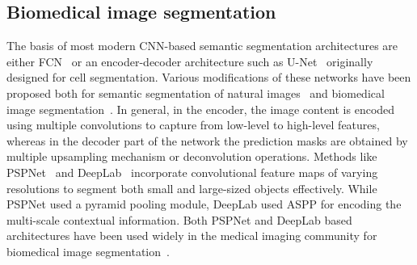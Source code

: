 \documentclass[journal]{IEEEtran}
\begin{document}
\subsection{Biomedical image segmentation}
The basis of most modern \ac{CNN}-based semantic segmentation architectures are either \ac{FCN}~\cite{long2015fully} or an encoder-decoder architecture such as  U-Net~\cite{ronneberger2015u} originally designed for cell segmentation. Various modifications of these networks have been proposed both for semantic segmentation of natural images~\cite{zhao2017pyramid,wang2020deep} and biomedical image segmentation~\cite{zhou2018unet,oktay2018attention,zhou2019unet++,fan2020pranet,jha2019resunet++,jha2020doubleu,wang2020boundary}. In general, in the encoder, the image content is encoded using multiple convolutions to capture from low-level to high-level features, whereas in the decoder part of the network the prediction masks are obtained by multiple upsampling mechanism {or deconvolution operations}. Methods like PSPNet~\cite{zhao2017pyramid} and DeepLab~\cite{chen2017deeplab} incorporate convolutional feature maps of varying resolutions to segment both small and large-sized objects effectively. While PSPNet used a pyramid pooling module, DeepLab used \ac{ASPP} for encoding the multi-scale contextual information. Both PSPNet and DeepLab based architectures have been used widely in the medical imaging community {for biomedical image segmentation~\cite{hassan2020,sun2019colorectal}}.
\end{document}
